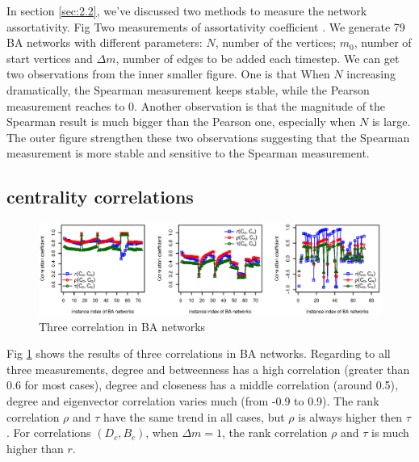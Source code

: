 \documentclass[symmetry,article,submit,moreauthors,pdftex,10pt,a4paper]{Definitions/mdpi}
\begin{document}
In section \ref{sec:2.2}, we've discussed two methods to measure the network assortativity. Fig\cite{fig:1} Two measurements of assortativity coefficient .  We generate 79 BA networks with different parameters: $N$, number of the vertices; $m_0$, number of start vertices and $\Delta m$, number of edges to be added each timestep. We can get two observations  from the inner smaller figure. One is that When $N$ increasing dramatically, the Spearman measurement keeps stable, while the Pearson measurement reaches to 0. Another observation is that the magnitude of the Spearman result is much bigger than the Pearson one, especially when $N$ is large. The outer figure strengthen these two observations suggesting that the Spearman measurement is more stable and sensitive to the Spearman measurement.

\subsection{centrality correlations}

\begin{figure}
    \centering
    \includegraphics[width=0.96\columnwidth]{figs/ba-correlations}
    \caption{Three correlation in BA networks}
    \label{fig:2}       %
\end{figure}

Fig \ref{fig:2} shows the results of three correlations in BA networks. Regarding to all three measurements, degree and betweenness has a high correlation (greater than 0.6 for most cases), degree and closeness has a middle correlation (around 0.5), degree and eigenvector correlation varies much (from -0.9 to 0.9). The rank correlation $\rho$ and $\tau$ have the same trend in all cases, but $\rho$ is always higher then $\tau$. For correlations $(D_c, B_c)$, when $\Delta m=1$, the rank correlation $\rho$ and $\tau$ is much higher than $r$.
\end{document}
